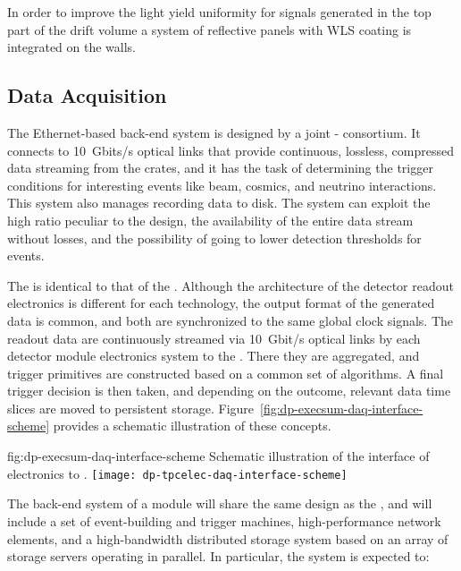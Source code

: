In order to improve the light yield uniformity for signals generated in the top part of the drift volume a system of reflective panels with WLS coating is integrated on the   walls.


\subsection{Data Acquisition}
\label{sec:dp-execsum-daq}

The Ethernet-based  back-end system is designed by a joint - consortium. It connects to 
\SI{10}{Gbits/s} optical links that provide continuous, lossless, compressed data streaming from the  crates, and it has the task of determining the trigger conditions for interesting events like beam, cosmics, and  neutrino interactions. This system also manages recording data to disk. The system can exploit the high  ratio peculiar to the  design, the availability of the entire data stream without losses, and the possibility of going to lower detection thresholds for  events.

The   is identical to that of the . %
Although the architecture of the detector readout electronics is different for each technology, the output format of the generated data is common, and both are synchronized to the same global clock signals. The readout data are continuously streamed via \SI{10}{Gbit/s}  optical links by each detector module  electronics system to the . There they are aggregated, and trigger primitives are constructed based on a common set of algorithms. A final trigger decision is then taken, and depending on the outcome, relevant data time slices are moved to persistent storage. Figure~\ref{fig:dp-execsum-daq-interface-scheme} provides a schematic illustration of these concepts.
  

\begin{dunefigure}{fig:dp-execsum-daq-interface-scheme}
{Schematic illustration of the interface of   electronics to .}
\texttt{[image: dp-tpcelec-daq-interface-scheme]}
\end{dunefigure}

The  back-end system of a  module will share the same design as the , and will include a set of event-building and trigger machines, high-performance network elements, and a high-bandwidth distributed storage system based on an array of storage servers operating in parallel. In particular, the  system is expected to:

